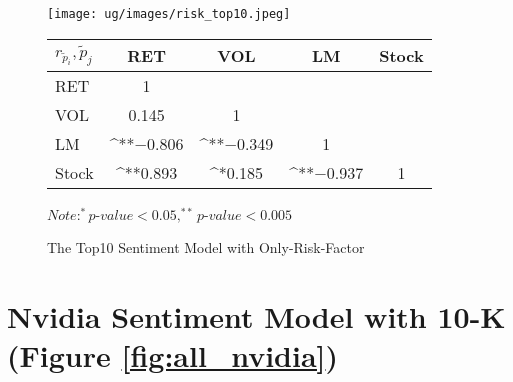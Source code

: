 \documentclass[logo,bsc,singlespacing,parskip]{infthesis}
\begin{document}
\begin{figure}[h]
\centering
\begin{minipage}{0.90\textwidth}
    \centering
    \texttt{[image: ug/images/risk\_top10.jpeg]}
    \caption{The Top10 Sentiment Model with Only-Risk-Factor}
    \label{fig:risk_top10}
\end{minipage}%
\hfill
\vspace{30pt} %
\begin{minipage}{0.9\textwidth}

    \begin{minipage}[p]{0.9\textwidth}
    \centering
    \begin{tabular}{lcccc}
    \label{tab:risk_top10_corr}
    $r_\tilde{p}_i,\tilde{p}_j$      & RET       & VOL       & LM        & Stock    \\ \hline
RET    & 1  &   &  &  \\
VOL    & 0.145   & 1  &  &   \\
LM    & ^{**}$-$0.806 & ^{**}$-$0.349 & 1  &  \\
Stock  & ^{**}0.893 & ^{*}0.185  & ^{**}$-$0.937 & 1  \\ \hline
    \end{tabular}
    \medskip
    $\textit{Note}: ^{*}p$-$value<0.05, ^{**}p$-$value<0.005$
    \end{minipage}

\end{minipage}
\end{figure}

\section{Nvidia Sentiment Model with 10-K (Figure \ref{fig:all_nvidia})}
\label{appendix_corr_all_nvidia}
\end{document}
